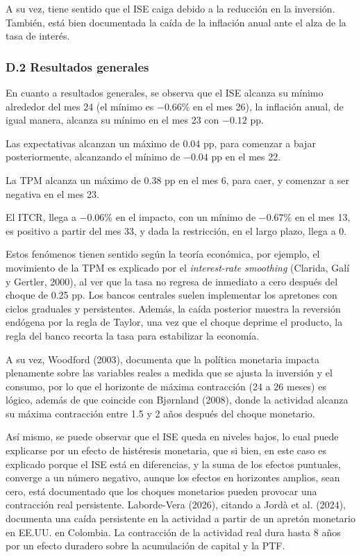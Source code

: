 \documentclass[12pt,letterpaper]{article}
\newcommand{\rutacuadros}{cuadros/}
\newcommand{\cuadro}[1]{}
\begin{document}
A su vez, tiene sentido que el ISE caiga debido a la reducción en la inversión. También, está bien documentada la caída de la inflación anual ante el alza de la tasa de interés.

\subsubsection*{D.2 Resultados generales}

\cuadro{cuadro_D_resultados_generales}

En cuanto a resultados generales, se observa que el ISE alcanza su mínimo alrededor del mes 24 (el mínimo es $-0.66$\% en el mes 26), la inflación anual, de igual manera, alcanza su mínimo en el mes 23 con $-0.12$ pp.

Las expectativas alcanzan un máximo de 0.04 pp, para comenzar a bajar posteriormente, alcanzando el mínimo de $-0.04$ pp en el mes 22.

La TPM alcanza un máximo de 0.38 pp en el mes 6, para caer, y comenzar a ser negativa en el mes 23.

El ITCR, llega a $-0.06$\% en el impacto, con un mínimo de $-0.67$\% en el mes 13, es positivo a partir del mes 33, y dada la restricción, en el largo plazo, llega a 0.

Estos fenómenos tienen sentido según la teoría económica, por ejemplo, el movimiento de la TPM es explicado por el \textit{interest-rate smoothing} (Clarida, Galí y Gertler, 2000), al ver que la tasa no regresa de inmediato a cero después del choque de 0.25 pp. Los bancos centrales suelen implementar los apretones con ciclos graduales y persistentes. Además, la caída posterior muestra la reversión endógena por la regla de Taylor, una vez que el choque deprime el producto, la regla del banco recorta la tasa para estabilizar la economía.

A su vez, Woodford (2003), documenta que la política monetaria impacta plenamente sobre las variables reales a medida que se ajusta la inversión y el consumo, por lo que el horizonte de máxima contracción (24 a 26 meses) es lógico, además de que coincide con Bj{\o}rnland (2008), donde la actividad alcanza su máxima contracción entre 1.5 y 2 años después del choque monetario.

Así mismo, se puede observar que el ISE queda en niveles bajos, lo cual puede explicarse por un efecto de histéresis monetaria, que si bien, en este caso es explicado porque el ISE está en diferencias, y la suma de los efectos puntuales, converge a un número negativo, aunque los efectos en horizontes amplios, sean cero, está documentado que los choques monetarios pueden provocar una contracción real persistente. Laborde-Vera (2026), citando a Jordà et al. (2024), documenta una caída persistente en la actividad a partir de un apretón monetario en EE.UU. en Colombia. La contracción de la actividad real dura hasta 8 años por un efecto duradero sobre la acumulación de capital y la PTF.
\end{document}
